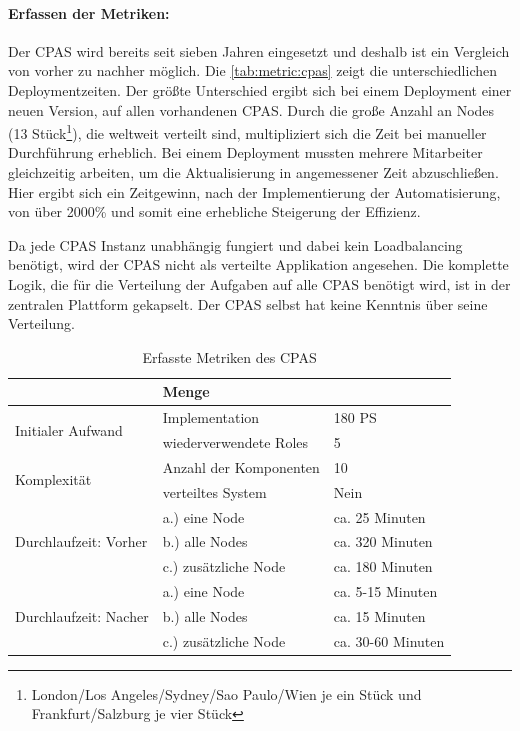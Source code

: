 \paragraph{Erfassen der Metriken:}
Der CPAS wird bereits seit sieben Jahren eingesetzt und deshalb ist ein Vergleich von vorher zu nachher möglich. Die \autoref{tab:metric:cpas} zeigt die unterschiedlichen Deploymentzeiten. Der größte Unterschied ergibt sich bei einem Deployment einer neuen Version, auf allen vorhandenen CPAS. Durch die große Anzahl an Nodes (13 Stück\footnote{London/Los Angeles/Sydney/Sao Paulo/Wien je ein Stück und Frankfurt/Salzburg je vier Stück}), die weltweit verteilt sind, multipliziert sich die Zeit bei manueller Durchführung erheblich. Bei einem Deployment mussten mehrere Mitarbeiter gleichzeitig arbeiten, um die Aktualisierung in angemessener Zeit abzuschließen. Hier ergibt sich ein Zeitgewinn, nach der Implementierung der Automatisierung, von über 2000\% und somit eine erhebliche Steigerung der Effizienz.

Da jede CPAS Instanz unabhängig fungiert und dabei kein Loadbalancing benötigt, wird der CPAS nicht als verteilte Applikation angesehen. Die komplette Logik, die für die Verteilung der Aufgaben auf alle CPAS benötigt wird, ist in der zentralen Plattform gekapselt. Der CPAS selbst hat keine Kenntnis über seine Verteilung.

\begin{table}[ht]
\setlength{\tabcolsep}{5pt}
\renewcommand{\arraystretch}{1.5}
\centering
\begin{tabular}{|l|l|l|}
\hline
\rowcolor[HTML]{C0C0C0}
\multicolumn{2}{|c|}{\textbf{Metrik}} & \textbf{Menge}					\\ 
\hline
\multirow{2}{*}{Initialer Aufwand}	& Implementation & 180 PS	\\ 
\cline{2-3}
									& wiederverwendete Roles & 5		\\
\hline 
\multirow{2}{*}{Komplexität}			& Anzahl der Komponenten & 10		\\
\cline{2-3}
									& verteiltes System		& Nein 		\\
\hline
\multirow{3}{*}{Durchlaufzeit: Vorher} & a.) eine Node		& ca. 25 Minuten	\\ 
\cline{2-3} 
									& b.) alle Nodes		& ca. 320 Minuten\\ 
\cline{2-3}							
									& c.) zusätzliche Node	& ca. 180 Minuten \\
\hline
\multirow{3}{*}{Durchlaufzeit: Nacher} & a.) eine Node	& ca. 5-15 Minuten	\\ 
\cline{2-3} 
									& b.) alle Nodes		& ca. 15 Minuten	\\
\cline{2-3}
									& c.) zusätzliche Node	& ca. 30-60 Minuten\\
\hline
\end{tabular} 
\caption{Erfasste Metriken des CPAS}
\label{tab:metric:cpas}
\end{table}

